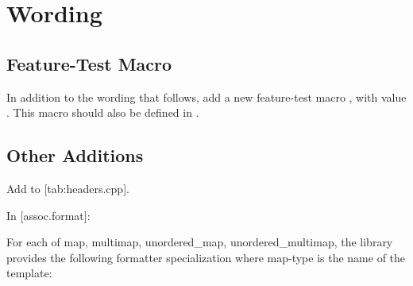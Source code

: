 \section{Wording}

\subsection{Feature-Test Macro}

In addition to the wording that follows, add a new feature-test macro
, with value .  This macro should also
be defined in .

\subsection{Other Additions}

Add  to [tab:headers.cpp].

In [assoc.format]:

For each of map, multimap, unordered_map,
unordered_multimap, the library provides
the following formatter specialization where map-type is the name of the
template:
